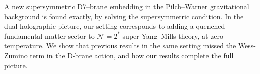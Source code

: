A new supersymmetric D7–brane embedding in the Pilch–Warner gravitational background is found exactly, by solving the supersymmetric condition. 
In the dual holographic picture, our setting corresponds to adding a quenched fundamental matter sector to  $\mathcal{N}=2^*$  super Yang–Mills theory, at zero temperature. We show that previous results in the same setting missed the Wess-Zumino term in the D-brane action, and how our results complete the full picture.
